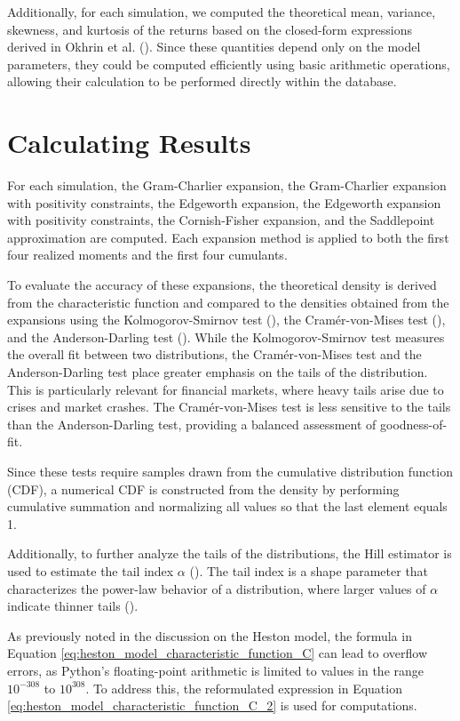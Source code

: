 Additionally, for each simulation, we computed the theoretical mean, variance, skewness, and kurtosis of the returns based on the closed-form expressions derived in Okhrin et al. (\citeyear{okhrinDistributionalPropertiesContinuous2023}). Since these quantities depend only on the model parameters, they could be computed efficiently using basic arithmetic operations, allowing their calculation to be performed directly within the database.

\section{Calculating Results}
For each simulation, the Gram-Charlier expansion, the Gram-Charlier expansion with positivity constraints, the Edgeworth expansion, the Edgeworth expansion with positivity constraints, the Cornish-Fisher expansion, and the Saddlepoint approximation are computed. Each expansion method is applied to both the first four realized moments and the first four cumulants.

To evaluate the accuracy of these expansions, the theoretical density is derived from the characteristic function and compared to the densities obtained from the expansions using the Kolmogorov-Smirnov test (\cite{kolmogorovSullaDeterminazioneEmpirica1993}), the Cramér-von-Mises test (\cite{vonmisesWahrscheinlichkeitStatistikUnd1928, cramerCompositionElementaryErrors1928, andersonDistributionTwoSampleCramervon1962}), and the Anderson-Darling test (\cite{andersonTestGoodnessFit1954}). While the Kolmogorov-Smirnov test measures the overall fit between two distributions, the Cramér-von-Mises test and the Anderson-Darling test place greater emphasis on the tails of the distribution. This is particularly relevant for financial markets, where heavy tails arise due to crises and market crashes. The Cramér-von-Mises test is less sensitive to the tails than the Anderson-Darling test, providing a balanced assessment of goodness-of-fit.

Since these tests require samples drawn from the cumulative distribution function (CDF), a numerical CDF is constructed from the density by performing cumulative summation and normalizing all values so that the last element equals 1.

Additionally, to further analyze the tails of the distributions, the Hill estimator is used to estimate the tail index $\alpha$ (\cite{hillSimpleGeneralApproach1975}). The tail index is a shape parameter that characterizes the power-law behavior of a distribution, where larger values of $\alpha$ indicate thinner tails (\cite{fischlerAnswerDefinitionTailindex2017, danielssonTailIndexEstimation2016}).

As previously noted in the discussion on the Heston model, the formula in Equation \eqref{eq:heston_model_characteristic_function_C} can lead to overflow errors, as Python's floating-point arithmetic is limited to values in the range $10^{-308}$ to $10^{308}$. To address this, the reformulated expression in Equation \eqref{eq:heston_model_characteristic_function_C_2} is used for computations.
